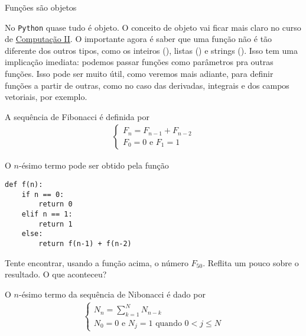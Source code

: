 \documentclass[12pt]{article}
\begin{document}
	
	
	\begin{interlude}{Funções são objetos}
	
	No \texttt{Python} quase tudo é objeto. O conceito de objeto vai ficar mais claro no curso de \href{https://github.com/pedromxavier/monitoria/raw/master/tex/comp2.pdf}{Computação II}. O importante agora é saber que uma função não é tão diferente dos outros tipos, como os inteiros (), listas () e strings (). Isso tem uma implicação imediata: podemos passar funções como parâmetros pra outras funções. Isso pode ser muito útil, como veremos mais adiante, para definir funções a partir de outras, como no caso das derivadas, integrais e dos campos vetoriais, por exemplo.
	
	\end{interlude}	
	
	
	A sequência de Fibonacci é definida por
	\begin{align*}
		\begin{cases}
		F_{n} = F_{n-1} + F_{n-2}\\
		F_{0} = 0 \text{ e } F_{1} = 1
		\end{cases}
	\end{align*}
	
	O $n$-ésimo termo pode ser obtido pela função

	\begin{lstlisting}[caption="Fibonacci"]
def f(n):
	if n == 0:
		return 0
	elif n == 1:
		return 1
	else:
		return f(n-1) + f(n-2)
	\end{lstlisting}
	
	\quest Tente encontrar, usando a função acima, o número $F_{50}$. Reflita um pouco sobre o resultado. O que aconteceu?
	
	
	O $n$-ésimo termo da sequência de Nibonacci é dado por
	\begin{align*}
		\begin{cases}
		\displaystyle N_{n} = \sum_{k=1}^{N} N_{n-k}\\
		N_{0} = 0 \text{ e } N_{j} = 1 \text{ quando } 0 < j \leq N
		\end{cases}
	\end{align*}
	
\end{document}
